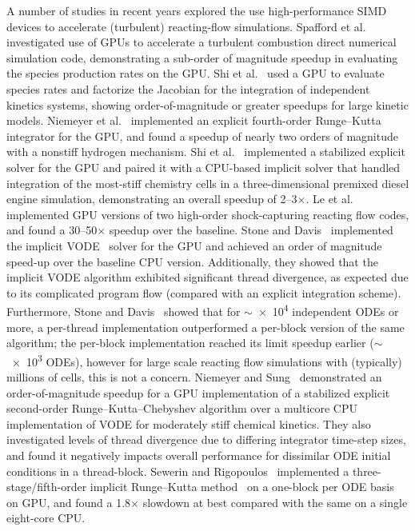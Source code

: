 \documentclass[final,twocolumn]{elsarticle}
\begin{document}
A number of studies in recent years explored the use high-performance SIMD devices to accelerate (turbulent) reacting-flow simulations.
Spafford et al.~\cite{Spafford:2010aa} investigated use of GPUs to accelerate a turbulent combustion direct numerical simulation code, demonstrating a sub-order of magnitude speedup in evaluating the species production rates on the GPU.
Shi et al.~\cite{Shi:2011aa} used a GPU to evaluate species rates and factorize the Jacobian for the integration of independent kinetics systems, showing order-of-magnitude or greater speedups for large kinetic models.
Niemeyer et al.~\cite{Niemeyer:2011aa} implemented an explicit fourth-order Runge--Kutta integrator for the GPU, and found a speedup of nearly two orders of magnitude with a nonstiff hydrogen mechanism.
Shi et al.~\cite{Shi:2012aa} implemented a stabilized explicit solver for the GPU and paired it with a CPU-based implicit solver that handled integration of the most-stiff chemistry cells in a three-dimensional premixed diesel engine simulation, demonstrating an overall speedup of \numrange{2}{3}$\times$.
Le et al.~\cite{Le2013596} implemented GPU versions of two high-order shock-capturing reacting flow codes, and found a \numrange{30}{50}$\times$ speedup over the baseline.
Stone and Davis~\cite{Stone:2013aa} implemented the implicit VODE~\cite{Brown:1989vl} solver for the GPU and achieved an order of magnitude speed-up over the baseline CPU version.
Additionally, they showed that the implicit VODE algorithm exhibited significant thread divergence, as expected due to its complicated program flow (compared with an explicit integration scheme).
Furthermore, Stone and Davis~\cite{Stone:2013aa} showed that for $\sim$\num{e4} independent ODEs or more, a per-thread implementation outperformed a per-block version of the same algorithm; the per-block implementation reached its limit speedup earlier ($\sim$\num{e3} ODEs), however for large scale reacting flow simulations with (typically) millions of cells, this is not a concern.
Niemeyer and Sung~\cite{Niemeyer:2014aa} demonstrated an order-of-magnitude speedup for a GPU implementation of a stabilized explicit second-order Runge--Kutta--Chebyshev algorithm over a multicore CPU implementation of VODE for moderately stiff chemical kinetics.
They also investigated levels of thread divergence due to differing integrator time-step sizes, and found it negatively impacts overall performance for dissimilar ODE initial conditions in a thread-block.
Sewerin and Rigopoulos~\cite{Sewerin20151375} implemented a three-stage\slash fifth-order implicit Runge--Kutta method~\cite{wanner1991solving} on a one-block per ODE basis on GPU, and found a \num{1.8}$\times$ slowdown at best compared with the same on a single eight-core CPU.
\end{document}
